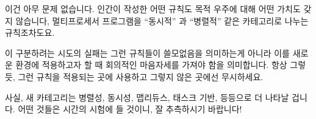 이건 아무 문제 없습니다.
인간이 작성한 어떤 규칙도 목적 우주에 대해 어떤 가치도 갖지 않습니다,
멀티프로세서 프로그램을 ``동시적'' 과 ``병렬적'' 같은 카테고리로 나누는
규칙조차도요.

이 구분하려는 시도의 실패는 그런 규칙들이 쓸모없음을 의미하는게 아니라 이를
새로운 환경에 적용하고자 할 때 회의적인 마음자세를 가져야 함을 의미합니다.
항상 그렇듯, 그런 규칙을 적용되는 곳에 사용하고 그렇지 않은 곳에선 무시하세요.

사실, 새 카테고리는 병렬성, 동시성, 맵리듀스, 태스크 기반, 등등으로 더 나타날
겁니다.
어떤 것들은 시간의 시험에 들 것이니, 잘 추측하시기 바랍니다!

\iffalse

Which is just fine.
No rule that humankind writes carries any weight against the objective
universe, not even rules dividing multiprocessor programs into categories
such as ``concurrent'' and ``parallel''.

This categorization failure does not mean such rules are useless,
but rather that you should take on a suitably skeptical frame of mind when
attempting to apply them to new situations.
As always, use such rules where they apply and ignore them otherwise.

In fact, it is likely that new categories will arise in addition
to parallel, concurrent, map-reduce, task-based, and so on.
Some will stand the test of time, but good luck guessing which!

\fi
